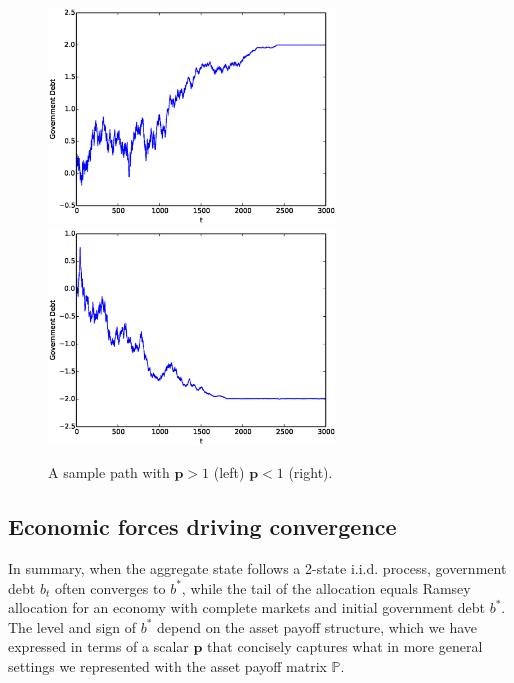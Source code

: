 \documentclass[12pt]{article}
\begin{document}
\begin{figure}
	\begin{center}
	\includegraphics[width=3in]{Images/port1.eps}
	\includegraphics[width=3in]{Images/port2.eps}
\caption{A sample path with $\bm p > 1$ (left)  $\bm{p} <1$ (right).\label{fig:2ps_figure}}
	\end{center}	
\end{figure}

\subsection{Economic forces driving convergence}
In summary, when the aggregate state follows a 2-state i.i.d. process, government debt  $b_t$ often converges to $b^*$, while
the tail of the allocation equals  Ramsey allocation for an economy with complete markets and initial government  debt $b^*$.
  The level  and sign of $b^*$ depend on the asset payoff structure, which we have  expressed in terms of a  scalar
  $\bm{p}$ that concisely captures what in more general settings we represented with the asset payoff matrix $\mathbb{P}$.
\end{document}
